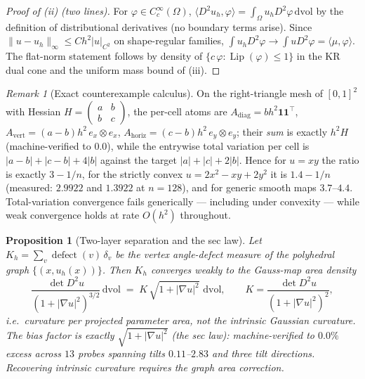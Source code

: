 \documentclass[11pt,a4paper]{article}
\theoremstyle{plain}
\newtheorem{proposition}[theorem]{Proposition}
\theoremstyle{definition}
\theoremstyle{remark}
\newtheorem{remark}[theorem]{Remark}
\newcommand{\Lip}{\operatorname{Lip}}
\newcommand{\dvol}{\,\mathrm{dvol}}
\begin{document}
\begin{proof}[Proof of (ii) (two lines)]
For $\varphi \in C_c^\infty(\Omega)$,
$\langle D^2 u_h, \varphi\rangle = \int_\Omega u_h D^2\varphi \dvol$ by the
definition of distributional derivatives (no boundary terms arise).
Since $\|u - u_h\|_\infty \le C h^2 |u|_{C^2}$ on shape-regular families,
$\int u_h D^2\varphi \to \int u D^2\varphi = \langle \mu, \varphi\rangle$.
The flat-norm statement follows by density of
$\{c\,\varphi : \Lip(\varphi)\le 1\}$ in the KR dual cone and the uniform
mass bound of (iii).
\end{proof}

\begin{remark}[Exact counterexample calculus]\label{rem:tvcounter}
On the right-triangle mesh of $[0,1]^2$ with Hessian
$H = \left(\begin{smallmatrix} a & b\\ b & c\end{smallmatrix}\right)$, the
per-cell atoms are $A_{\mathrm{diag}} = b h^2 \mathbf{1}\mathbf{1}^\top$,
$A_{\mathrm{vert}} = (a-b) h^2\, e_x \otimes e_x$,
$A_{\mathrm{horiz}} = (c-b) h^2\, e_y \otimes e_y$; their \emph{sum} is
exactly $h^2 H$ (machine-verified to $0.0$), while the entrywise total
variation per cell is $|a-b| + |c-b| + 4|b|$ against the target
$|a| + |c| + 2|b|$. Hence for $u = xy$ the ratio is exactly $3 - 1/n$, for
the strictly convex $u = 2x^2 - xy + 2y^2$ it is $1.4 - 1/n$ (measured:
$2.9922$ and $1.3922$ at $n=128$), and for generic smooth maps $3.7$--$4.4$.
Total-variation convergence fails generically --- including under
convexity --- while weak convergence holds at rate $O(h^2)$ throughout.
\end{remark}

\begin{proposition}[Two-layer separation and the sec law]
\label{prop:seclaw}
Let $K_h = \sum_v \operatorname{defect}(v)\,\delta_v$ be the vertex
angle-defect measure of the polyhedral graph
$\{(x, u_h(x))\}$. Then $K_h$ converges weakly to the \emph{Gauss-map area
density}
\[
\frac{\det D^2 u}{\left(1 + |\nabla u|^2\right)^{3/2}} \dvol
\;=\; K\,\sqrt{1+|\nabla u|^2}\,\dvol,
\qquad
K = \frac{\det D^2 u}{(1+|\nabla u|^2)^2},
\]
i.e.\ curvature per projected parameter area, \emph{not} the intrinsic
Gaussian curvature. The bias factor is exactly
$\sqrt{1+|\nabla u|^2}$ (the sec law): machine-verified to $0.0\%$ excess
across $13$ probes spanning tilts $0.11$--$2.83$ and three tilt
directions. Recovering intrinsic curvature requires the graph area
correction.
\end{proposition}
\end{document}
